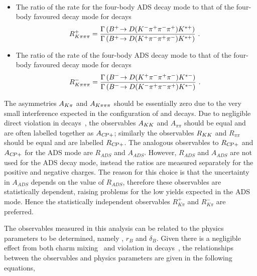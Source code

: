 \begin{itemize}
{{\begin{multline}
\label{eqn:Rpipipipi}
\end{multline}}}
\item{The ratio of the rate for the four-body ADS decay mode to that of the four-body favoured decay mode for \Bp decays
\begin{equation}
R^+_{K\pi\pi\pi} = \frac{\Gamma\left({{{B}^+}}\!\rightarrow {\ensuremath{D}}({{K}^-}{{\pi}^+}{{\pi}^-}{{\pi}^+}){{K}^{*+}}\right)}{\Gamma\left({{{B}^+}}\!\rightarrow {\ensuremath{D}}({{K}^+}{{\pi}^-}{{\pi}^+}{{\pi}^-}){{K}^{*+}}\right)} \text{ . }
\label{eqn:Rplus4body}
\end{equation}
}
\item{The ratio of the rate of the four-body ADS decay mode to that of the four-body favoured decay mode for \Bm decays
\begin{equation}
R^-_{K\pi\pi\pi} = \frac{\Gamma\left({{{B}^-}}\!\rightarrow {\ensuremath{D}}({{K}^+}{{\pi}^-}{{\pi}^+}{{\pi}^-}){{K}^{*-}}\right)}{\Gamma\left({{{B}^-}}\!\rightarrow {\ensuremath{D}}({{K}^-}{{\pi}^+}{{\pi}^-}{{\pi}^+}){{K}^{*-}}\right)} \text{ . }
\label{eqn:Rminus4body}
\end{equation}
}
\end{itemize}

\noindent
The asymmetries $A_{{K}\pi}$ and $A_{{K}\pi\pi\pi}$ should be essentially zero due to the very small interference expected in the configuration of \B and \D decays. Due to negligible direct \CP violation in \D decays~\cite{charmcpv}, the observables $A_{{K}{K}}$ and $A_{\pi\pi}$ should be equal and are often labelled together as $A_{{C\!P}+}$; similarly the observables $R_{{K}{K}}$ and $R_{\pi\pi}$ should be equal and are labelled $R_{{C\!P}+}$. The analogous observables to $R_{{C\!P}+}$ and $A_{{C\!P}+}$ for the ADS mode are $R_{ADS}$ and $A_{ADS}$. However, $R_{ADS}$ and $A_{ADS}$ are not used for the ADS decay mode, instead the ratios are measured separately for the positive and negative charges. The reason for this choice is that the uncertainty in $A_{ADS}$ depends on the value of $R_{ADS}$, therefore these observables are statistically dependent, raising problems for the low yields expected in the ADS mode. Hence the statistically independent observables $R^+_{K\pi}$ and $R^-_{K\pi}$ are preferred.

The \CP observables measured in this analysis can be related to the physics parameters to be determined, namely \Pgamma, $r_B$ and $\delta_B$. Given there is a negligible effect from both charm mixing~\cite{charmmixing} and \CP violation in \D decays~\cite{charmcpv}, the relationships between the \CP observables and physics parameters are given in the following equations,


